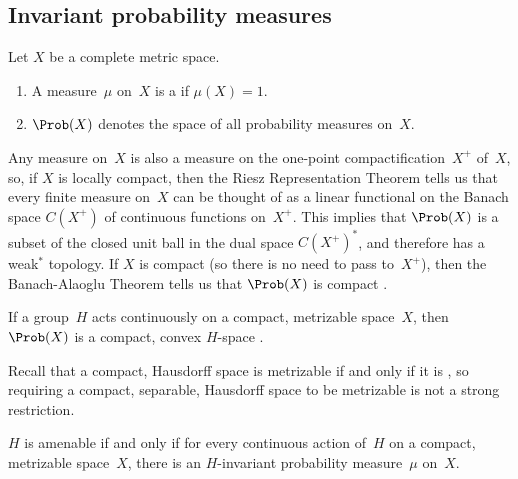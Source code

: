 \subsection{Invariant probability measures}

\begin{defns} 
Let $X$ be a complete metric space.
	\begin{enumerate}
	\item A measure~$\mu$ on~$X$ is a  if $\mu(X) = 1$.
	\item {}%
	$\Prob(X)$ denotes the space of all probability measures on~$X$.
	\end{enumerate}
Any measure on~$X$ is also a measure on the one-point compactification~$X^+$ of~$X$, so, if $X$ is locally compact, then the {Riesz Representation Theorem}  tells us that every finite measure on~$X$ can be thought of as a linear functional on the Banach space $C(X^+)$ of continuous functions on~$X^+$. This implies that $\Prob(X)$ is a subset of the closed unit ball in the dual space $C(X^+)^*$, and therefore has a weak$^*$ topology. If $X$ is compact (so there is no need to pass to~$X^+$), then the Banach-Alaoglu Theorem  tells us that $\Prob(X)$ is compact .
\end{defns}

\begin{eg} \label{Prob(X)CpctConvexEg}
If a group~$H$ acts continuously on a compact, metrizable space~$X$,
then $\Prob(X)$ is a compact, convex $H$-space .
\end{eg}

\begin{rem} \label{Metrizable<>2ndCount}
Recall that a compact, Hausdorff space is metrizable if and only if it is , so requiring a compact, separable, Hausdorff space to be metrizable is not a strong restriction.
\end{rem}

\begin{prop}[($\ref{AmenEquiv-amen} \Leftrightarrow \ref{AmenEquiv-InvMeas}$)]
$H$ is amenable if and only if for every continuous action of~$H$ on a compact, metrizable space~$X$, there is an $H$-invariant probability measure~$\mu$ on~$X$.
\end{prop}

